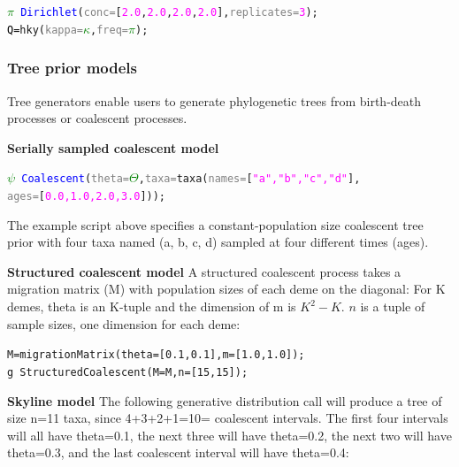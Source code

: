 \documentclass[10pt,letterpaper,table]{article}
\begin{document}
{\small
\begin{alltt}
    \textcolor{green}{\(\pi\)} ~ \textcolor{blue}{Dirichlet}(\textcolor{gray}{conc=}[\textcolor{magenta}{2.0}, \textcolor{magenta}{2.0}, \textcolor{magenta}{2.0}, \textcolor{magenta}{2.0}], \textcolor{gray}{replicates=}\textcolor{magenta}{3});
    \textcolor{black}{Q = }\textcolor{magenta!80!black}{hky}(\textcolor{gray}{kappa=}\textcolor{green}{\(\kappa\)}, \textcolor{gray}{freq=}\textcolor{green}{\(\pi\)});
\end{alltt} 


\subsubsection{Tree prior models}
\label{sec:treeprior}
Tree generators enable users to generate phylogenetic trees from birth-death processes or coalescent processes. 
\newline

\noindent{} \textbf{Serially sampled coalescent model}
{\small
  \begin{alltt}
    \textcolor{green}{\(\psi\)} ~ \textcolor{blue}{Coalescent}(\textcolor{gray}{theta=}\textcolor{green}{\(\Theta\)}, \textcolor{gray}{taxa=}\textcolor{magenta!80!black}{taxa}(\textcolor{gray}{names=}[\textcolor{magenta}{"a", "b", "c", "d"}], \\  \textcolor{gray}{ages=}[\textcolor{magenta}{0.0, 1.0, 2.0, 3.0}]));
  \end{alltt}
}
\noindent{} The example script above specifies a
constant-population size coalescent tree prior \cite{kingman82} with four taxa named (a, b, c, d) 
sampled at four different times (ages).
\newline 

\noindent{} \textbf{Structured coalescent model}
\newline
A structured coalescent process takes a migration matrix (M) with
population sizes of each deme on the diagonal:
For K demes, theta is an K-tuple and the dimension of m is $K^2 -
K$. $n$ is a tuple of sample sizes, one dimension for each deme:

{\small
  \begin{alltt}
    M = migrationMatrix(theta=[0.1, 0.1], m=[1.0, 1.0]);
    g ~ StructuredCoalescent(M=M, n=[15, 15]);
  \end{alltt}
}

\noindent{} \textbf{Skyline model}
\newline
The following generative distribution call will produce a tree of size
n=11 taxa, since 4+3+2+1=10= coalescent intervals.
The first four intervals will all have theta=0.1, the next three will
have theta=0.2, the next two will have theta=0.3, and the last
coalescent interval will have theta=0.4:

}
\end{document}

